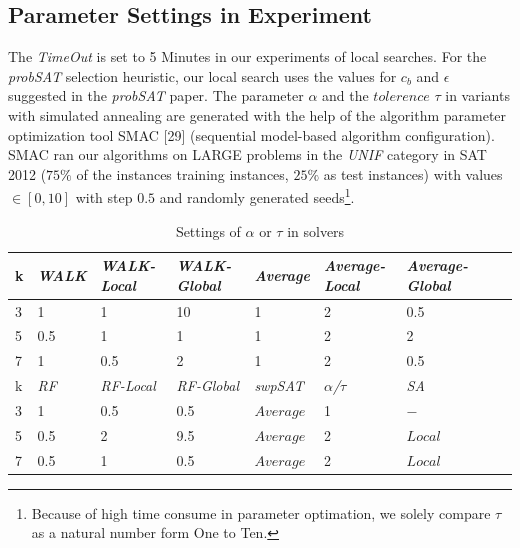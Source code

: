 \documentclass[12pt,a4paper,twoside]{scrartcl}
\numberwithin{equation}{section}
\begin{document}
\subsection{Parameter Settings in Experiment}
The \emph{TimeOut} is set to 5 Minutes in our experiments of local searches.  For the \emph{probSAT} selection heuristic, our local search uses the values for $c_b$ and $\epsilon$ suggested in the \emph{probSAT} paper.  The parameter $\alpha$ and the $tolerence$ $ \tau$ in variants with simulated annealing are generated with the help of the algorithm parameter optimization tool SMAC [29] (sequential model-based algorithm configuration). SMAC ran our algorithms on LARGE problems in the \emph{UNIF} category in SAT 2012 ($75\%$ of the instances training instances,  $25\%$ as test instances) with values $\in [0, 10]$ with step $0.5$ and randomly generated seeds\footnote{Because of high time consume in parameter optimation, we solely compare $\tau$  as a natural number form One to Ten.}.
   \begin{table}[H]
\begin{center}
    \begin{tabular}{|l|l|l|l||l|l|l|l|p{1cm}|}
\hline 

    k &\emph{WALK}&\emph{WALK-Local}&\emph{WALK-Global}&\emph{Average}&\emph{Average-Local}&\emph{Average-Global} \\ \hline
    3 & 1& 1 & 10 &  1 & 2& 0.5       \\ \hline  
    5 & 0.5& 1 & 1&  1 & 2& 2 \\ \hline  
    7 & 1& 0.5 & 2&  1 & 2& 0.5  \\ \hline  
 \hline  
    k &\emph{RF}&\emph{RF-Local}&\emph{RF-Global}&\emph{swpSAT}&\emph{$\alpha$/$\tau$}&\emph{SA} \\ \hline  
    3 & 1& 0.5 & 0.5&$Average$ & 1 & $-$\\ \hline 
    5 & 0.5& 2& 9.5&$Average$& 2 & $Local$\\ \hline 
    7 & 0.5& 1& 0.5 &$Average$&2 & $Local$\\ \hline 

	
\end{tabular}
\caption{Settings of $\alpha$ or $\tau$ in solvers}
\end{center}
\end{table}
\end{document}
